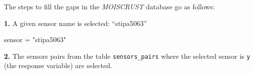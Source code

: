 \documentclass[]{article}
\newenvironment{Shaded}{\begin{snugshade}}{\end{snugshade}}
\newcommand{\KeywordTok}[1]{\textcolor[rgb]{0.13,0.29,0.53}{\textbf{#1}}}
\newcommand{\NormalTok}[1]{#1}
\newcommand{\OperatorTok}[1]{\textcolor[rgb]{0.81,0.36,0.00}{\textbf{#1}}}
\newcommand{\StringTok}[1]{\textcolor[rgb]{0.31,0.60,0.02}{#1}}
\begin{document}
The steps to fill the gaps in the \emph{MOISCRUST} database go as
follows:

\textbf{1.} A given sensor name is selected: ``stipa5063''

\begin{Shaded}
\begin{Highlighting}[]
\NormalTok{sensor =}\StringTok{ "stipa5063"}
\end{Highlighting}
\end{Shaded}

\textbf{2.} The sensors pairs from the table \texttt{sensors\_pairs}
where the selected sensor is \texttt{y} (the response variable) are
selected.

\begin{Shaded}
\end{Shaded}
\end{document}
